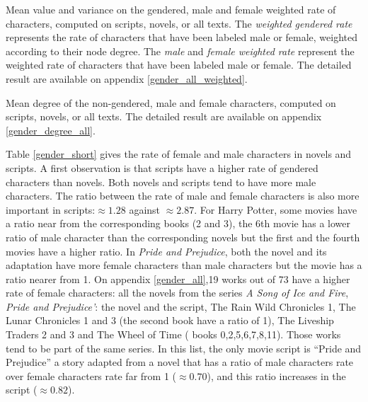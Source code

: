 \documentclass[a4paper, 12pt]{report}
\begin{document}
\begin{table}[]
\caption{Mean value and variance on the gendered, male and female weighted rate of characters, computed on scripts, novels, or all texts. The \textit{weighted gendered rate} represents the rate of characters that have been labeled male or female, weighted according to their node degree. The \textit{male} and \textit{female weighted rate} represent the weighted rate of characters that have been labeled male or female. The detailed result are available on appendix \ref{gender_all_weighted}. }
\label{gender_short_weighted}
\end{table}


\begin{table}[]
\caption{Mean degree of the non-gendered, male and female characters, computed on scripts, novels, or all texts. The detailed result are available on appendix \ref{gender_degree_all}. }
\label{gender_degree_short}
\end{table}


Table \ref{gender_short} gives the rate of female and male characters in novels and scripts. A first observation is that scripts have a higher rate of gendered characters than novels. Both novels and scripts tend to have more male characters.
The ratio between the rate of male and female characters is also more important in scripts:$\approx 1.28$ against $\approx 2.87$. For Harry Potter, some movies have a ratio near from the corresponding books (2 and 3), the 6th movie has a lower ratio of male character than the corresponding novels but the first and the fourth movies have a higher ratio. In \textit{Pride and Prejudice}, both the novel and its adaptation have more female characters than male characters but the movie has a ratio nearer from 1.
On appendix \ref{gender_all},19 works out of 73 have a higher rate of female characters: all the novels from the series \textit{A Song of Ice and Fire},  \textit{Pride and Prejudice'}: the novel and the script, The Rain Wild Chronicles 1, The Lunar Chronicles 1 and 3 (the second book have a ratio of 1), The Liveship Traders 2 and 3 and The Wheel of Time ( books 0,2,5,6,7,8,11). Those works tend to be part of the same series. In this list, the only movie script is ``Pride and Prejudice'' a story adapted from a novel that has a ratio of male characters rate over female characters rate far from 1 ($\approx 0.70$), and this ratio increases in the script ($\approx 0.82$).\\
\end{document}
